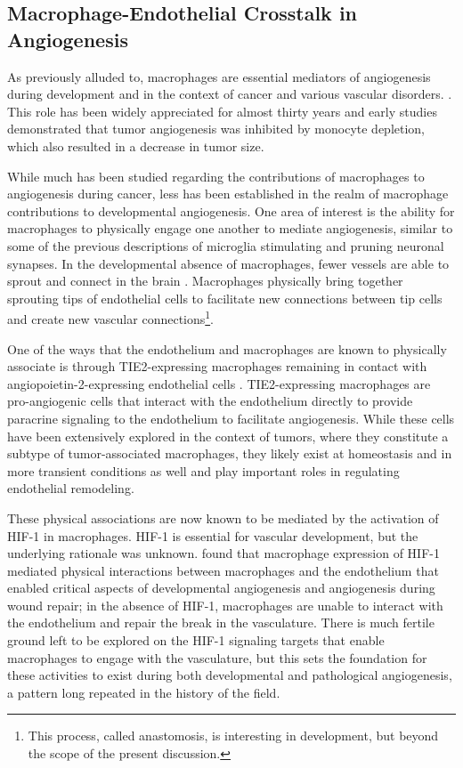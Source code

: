 \subsection{Macrophage-Endothelial Crosstalk in Angiogenesis}\label{macang}

As previously alluded to, macrophages are essential mediators of angiogenesis during development and in the context of cancer and various vascular disorders. \citep{}. This role has been widely appreciated for almost thirty years and early studies demonstrated that tumor angiogenesis was inhibited by monocyte depletion, which also resulted in a decrease in tumor size. 

While much has been studied regarding the contributions of macrophages to angiogenesis during cancer, less has been established in the realm of macrophage contributions to developmental angiogenesis. One area of interest is the ability for macrophages to physically engage one another to mediate angiogenesis, similar to some of the previous descriptions of microglia stimulating and pruning neuronal synapses. In the developmental absence of macrophages, fewer vessels are able to sprout and connect in the brain \citep{Fantin2010}. Macrophages physically bring together sprouting tips of endothelial cells to facilitate new connections between tip cells and create new vascular connections\footnote{This process, called anastomosis, is interesting in development, but beyond the scope of the present discussion.}. 

One of the ways that the endothelium and macrophages are known to physically associate is through TIE2-expressing macrophages remaining in contact with angiopoietin-2-expressing endothelial cells \citep{Baer2013}. TIE2-expressing macrophages are pro-angiogenic cells that interact with the endothelium directly to provide paracrine signaling to the endothelium to facilitate angiogenesis. While these cells have been extensively explored in the context of tumors, where they constitute a subtype of tumor-associated macrophages, they likely exist at homeostasis and in more transient conditions as well and play important roles in regulating endothelial remodeling.

These physical associations are now known to be mediated by the activation of HIF-1\textalpha{} in macrophages. HIF-1\textalpha{} is essential for vascular development, but the underlying rationale was unknown. \citet{Gerri2017} found that macrophage expression of HIF-1\textalpha{} mediated physical interactions between macrophages and the endothelium that enabled critical aspects of developmental angiogenesis and angiogenesis during wound repair; in the absence of HIF-1\textalpha, macrophages are unable to interact with the endothelium and repair the break in the vasculature. There is much fertile ground left to be explored on the HIF-1\textalpha{} signaling targets that enable macrophages to engage with the vasculature, but this sets the foundation for these activities to exist during both developmental and pathological angiogenesis, a pattern long repeated in the history of the field.

